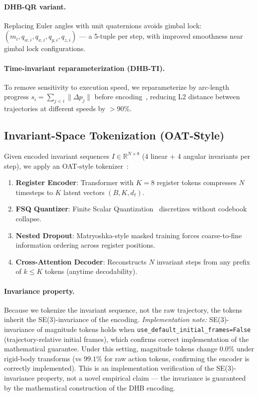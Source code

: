 \paragraph{DHB-QR variant.}
Replacing Euler angles with unit quaternions avoids gimbal lock:
$(m_i, q_{w,i}, q_{x,i}, q_{y,i}, q_{z,i})$ — a 5-tuple per step,
with improved smoothness near gimbal lock configurations.

\paragraph{Time-invariant reparameterization (DHB-TI).}
To remove sensitivity to execution speed, we reparameterize by arc-length progress
$s_i = \sum_{j<i} \|\Delta p_j\|$ before encoding~\cite{soloperto2015},
reducing L2 distance between trajectories at different speeds by $>90\%$.

\subsection{Invariant-Space Tokenization (OAT-Style)}
\label{sec:tokenization}

Given encoded invariant sequences $I \in \mathbb{R}^{N \times 8}$
(4 linear + 4 angular invariants per step),
we apply an OAT-style tokenizer~\cite{oat2026}:

\begin{enumerate}
\item \textbf{Register Encoder}: Transformer with $K{=}8$ register tokens
      compresses $N$ timesteps to $K$ latent vectors $(B, K, d_\ell)$.
\item \textbf{FSQ Quantizer}: Finite Scalar Quantization~\cite{mentzer2024fsq}
      discretizes without codebook collapse.
\item \textbf{Nested Dropout}: Matryoshka-style masked training forces
      coarse-to-fine information ordering across register positions.
\item \textbf{Cross-Attention Decoder}: Reconstructs $N$ invariant steps from
      any prefix of $k \leq K$ tokens (anytime decodability).
\end{enumerate}

\paragraph{Invariance property.}
Because we tokenize the invariant sequence, not the raw trajectory,
the tokens inherit the SE(3)-invariance of the encoding.
\textit{Implementation note:} SE(3)-invariance of magnitude tokens holds when
\texttt{use\_default\_initial\_frames=False} (trajectory-relative initial frames),
which confirms correct implementation of the mathematical guarantee.
Under this setting, magnitude tokens change $0.0\%$ under rigid-body transforms
(vs $99.1\%$ for raw action tokens, confirming the encoder is correctly implemented).
This is an implementation verification of the SE(3)-invariance property,
not a novel empirical claim — the invariance is guaranteed by the mathematical construction
of the DHB encoding.

